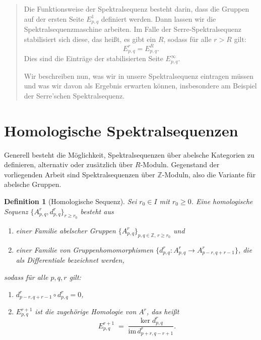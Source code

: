 \documentclass[12pt]{article}
\numberwithin{conj}{section}
\newtheorem{definition}[conj]{Definition}
\newcommand{\Z}{\mathbb{Z}}
\begin{document}
\begin{abstract}
        Die Funktionsweise der Spektralsequenz besteht darin, dass die Gruppen auf der
        ersten Seite $E^{1}_{p,q}$ definiert werden. Dann lassen wir die
        Spektralsequenzmaschine arbeiten. Im Falle der Serre-Spektralsequenz stabilisiert
        sich diese, das heißt, es gibt ein $R$, sodass für alle $r > R$ gilt:
        \[
            E^{r}_{p,q}= E^{R}_{p,q}.
        \]
        Dies sind die Einträge der stabilisierten Seite $E^{\infty}_{p,q}$.

        Wir beschreiben nun, was wir in unsere Spektralsequenz eintragen müssen und
        was wir davon als Ergebnis erwarten können, insbesondere am Beispiel der Serre’schen
        Spektralsequenz.
    \end{abstract}

    \begin{Large}
        \tableofcontents
    \end{Large}

    \section{Homologische Spektralsequenzen}
    Generell besteht die Möglichkeit, Spektralsequenzen über abelsche Kategorien zu
    definieren, alternativ oder zusätzlich über $R$-Moduln. Gegenstand der vorliegenden
    Arbeit sind Spektralsequenzen über $\mathbb{Z}$-Moduln, also die Variante für
    abelsche Gruppen.

    \begin{definition}[Homologische Sequenz]
        \label{homologischeSequenz} Sei $r_{0} \in I$ mit $r_{0} \geq 0$. Eine
        homologische Sequenz $\{A^{r}_{p,q}, d^{r}_{p,q}\}_{r \geq r_0}$ besteht aus
        \begin{enumerate}[nolistsep]
            \item einer Familie abelscher Gruppen $\{A^{r}_{p,q}\}_{p,q \in \Z,\, r
                \geq r_0}$ und

            \item einer Familie von Gruppenhomomorphismen $\{d^{r}_{p,q}: A^{r}_{p,q}\to
                A^{r}_{p-r,q+r-1}\}$, die als Differentiale bezeichnet werden,
        \end{enumerate}
        sodass für alle $p,q,r$ gilt:
        \begin{enumerate}[nolistsep]
            \item $d^{r}_{p-r,q+r-1}\circ d^{r}_{p,q}= 0$,

            \item $E^{r+1}_{p,q}$ ist die zugehörige Homologie von $A^{r}$, das heißt
                \[
                    E^{r+1}_{p,q}\;=\; \frac{\ker d^{r}_{p,q}}{\mathrm{im}\,d^{r}_{p+r,q-r+1}}
                    .
                \]
        \end{enumerate}
    \end{definition}
\end{document}

